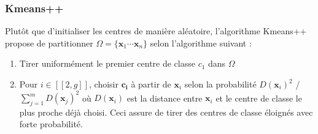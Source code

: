 \documentclass[letterpaper,10pt,french]{sphinxmanual}
\begin{document}
\subsubsection{K\sphinxhyphen{}means++}
\label{\detokenize{clustering:k-means}}
\sphinxAtStartPar
Plutôt que d’initialiser les centres de manière aléatoire, l’algorithme K\sphinxhyphen{}means++ propose de partitionner \(\Omega=\{\mathbf x_1\cdots \mathbf x_n\}\) selon l’algorithme suivant :
\begin{enumerate}
%
\item {} 
\sphinxAtStartPar
Tirer uniformément le premier centre de classe \(c_1\) dans \(\Omega\)

\item {} 
\sphinxAtStartPar
Pour \(i\in[\![2,g]\!]\), choisir \(\mathbf{c_i}\) à partir de \(\mathbf x_i\) selon la probabilité \(D(\mathbf{x}_i)^2\) / \(\displaystyle\sum\limits_{j=1}^{m}{D(\mathbf{x}_j)}^2\) où  \(D(\mathbf{x}_i)\) est la distance entre \(\mathbf{x}_i\) et le centre de classe le plus proche déjà choisi. Ceci assure de tirer des centres de classe éloignés avec forte probabilité.

\end{enumerate}
\end{document}
